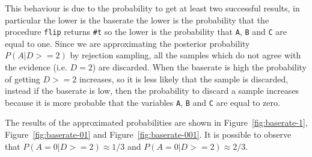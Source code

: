 This behaviour is due to the probability to get at least two successful results, in particular the lower is the baserate the lower
is the probability that the procedure \texttt{flip} returns \texttt{\#t} so the lower is the probability that \texttt{A}, \texttt{B}
and \texttt{C} are equal to one.
Since we are approximating the posterior probability $ P(A | D >= 2) $ by rejection sampling, all the samples which do not agree with
the evidence (i.e. $D = 2$) are discarded. When the baserate is high the probability of getting $ D >= 2 $ increases, so it is
less likely that the sample is discarded, instead if the baserate is low, then the probability to discard a sample increases
because it is more probable that the variables \texttt{A}, \texttt{B} and \texttt{C} are equal to zero.

The results of the approximated probabilities are shown in Figure~\ref{fig:baserate-1}, Figure~\ref{fig:baserate-01} and
Figure~\ref{fig:baserate-001}. It is possible to observe that $ P(A = 0 | D >= 2) \approx 1/3 $ and 
$ P(A = 0 | D >= 2) \approx 2/3 $.

